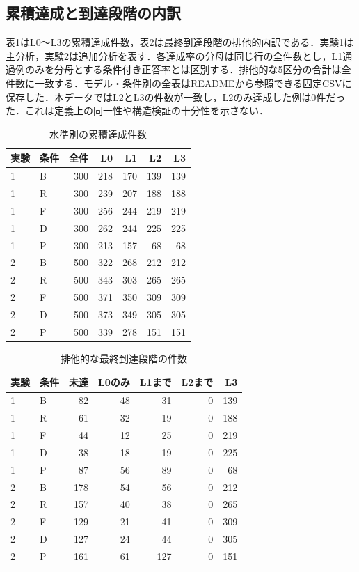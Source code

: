 \subsection{累積達成と到達段階の内訳}
表\ref{tab:levels}はL0〜L3の累積達成件数，表\ref{tab:exclusive}は最終到達段階の排他的内訳である．実験1は主分析，実験2は追加分析を表す．各達成率の分母は同じ行の全件数とし，L1通過例のみを分母とする条件付き正答率とは区別する．排他的な5区分の合計は全件数に一致する．モデル・条件別の全表はREADMEから参照できる固定CSVに保存した．本データではL2とL3の件数が一致し，L2のみ達成した例は0件だった．これは定義上の同一性や構造検証の十分性を示さない．
\begin{table}[t]
\centering
\caption{水準別の累積達成件数}
\label{tab:levels}
\begin{tabular}{ll|rrrrr}
\hline
実験 & 条件 & 全件 & L0 & L1 & L2 & L3 \\
\hline
1 & B & 300 & 218 & 170 & 139 & 139 \\
1 & R & 300 & 239 & 207 & 188 & 188 \\
1 & F & 300 & 256 & 244 & 219 & 219 \\
1 & D & 300 & 262 & 244 & 225 & 225 \\
1 & P & 300 & 213 & 157 & 68 & 68 \\
2 & B & 500 & 322 & 268 & 212 & 212 \\
2 & R & 500 & 343 & 303 & 265 & 265 \\
2 & F & 500 & 371 & 350 & 309 & 309 \\
2 & D & 500 & 373 & 349 & 305 & 305 \\
2 & P & 500 & 339 & 278 & 151 & 151 \\
\hline
\end{tabular}
\end{table}
\begin{table}[t]
\centering
\caption{排他的な最終到達段階の件数}
\label{tab:exclusive}
\setlength{\tabcolsep}{5pt}
\begin{tabular}{ll|rrrrr}
\hline
実験 & 条件 & 未達 & L0のみ & L1まで & L2まで & L3 \\
\hline
1 & B & 82 & 48 & 31 & 0 & 139 \\
1 & R & 61 & 32 & 19 & 0 & 188 \\
1 & F & 44 & 12 & 25 & 0 & 219 \\
1 & D & 38 & 18 & 19 & 0 & 225 \\
1 & P & 87 & 56 & 89 & 0 & 68 \\
2 & B & 178 & 54 & 56 & 0 & 212 \\
2 & R & 157 & 40 & 38 & 0 & 265 \\
2 & F & 129 & 21 & 41 & 0 & 309 \\
2 & D & 127 & 24 & 44 & 0 & 305 \\
2 & P & 161 & 61 & 127 & 0 & 151 \\
\hline
\end{tabular}
\end{table}
